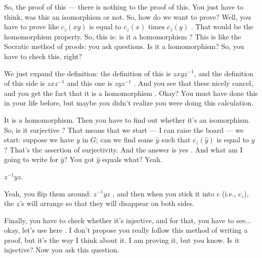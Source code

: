 \begin{proofWrapper}

\begin{speech}[00:19:43 - 00:21:29]
So, the proof of this --- there is nothing to the proof of this. You just have to think, was this an isomorphism or not. So, how do we want to prove? Well, you have to prove like $c_z(xy)$ is equal to $c_z(x)$ times $c_z(y)$ . That would be the homomorphism property. So, this is: is it a homomorphism ? This is like the Socratic method of proofs: you ask questions. Is it a homomorphism? So, you have to check this, right?

We just expand the definition: the definition of this is $z x y z^{-1}$, and the definition of this side is $z x z^{-1}$ and this one is $z y z^{-1}$ . And you see that these nicely cancel, and you get the fact that it is a homomorphism . Okay? You must have done this in your life before, but maybe you didn't realize you were doing this calculation.

It is a homomorphism. Then you have to find out whether it's an isomorphism. So, is it surjective ? That means that we start --- I can raise the board  --- we start: suppose we have $y$ in $G$; can we find some $\hat{y}$ such that $c_z(\hat{y})$ is equal to $y$ ? That's the assertion of surjectivity. And the answer is yes . And what am I going to write for $\hat{y}$? You got $\hat{y}$ equals what? Yeah.
\end{speech}

\begin{student}
$z^{-1} y z$.
\end{student}

\begin{speech}[00:21:30 - 00:23:12]
Yeah, you flip them around: $z^{-1} y z$ , and then when you stick it into $c$ (i.e., $c_z$), the $z$'s will arrange so that they will disappear on both sides.

Finally, you have to check whether it's injective, and for that, you have to see... okay, let's use here . I don't propose you really follow this method of writing a proof, but it's the way I think about it. I am proving it, but you know. Is it injective? Now you ask this question.


\end{speech}
\end{proofWrapper}
